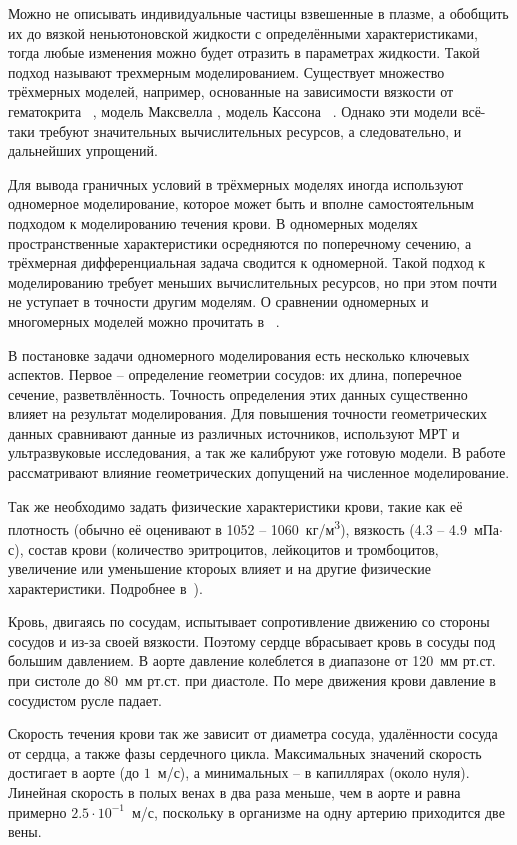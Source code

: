 Можно не описывать индивидуальные частицы взвешенные в плазме, а обобщить их до вязкой неньютоновской жидкости с определёнными 
характеристиками, тогда любые изменения можно будет отразить в параметрах жидкости. Такой подход называют трехмерным моделированием.
Существует множество трёхмерных моделей, например, основанные на зависимости вязкости от гематокрита ~\cite{walburn:1976},
модель Максвелла \cite{thurston:1972},  модель Кассона ~\cite{moller:2006}.
Однако эти модели всё-таки требуют значительных вычислительных ресурсов, а следовательно, и дальнейших упрощений. 

Для вывода граничных условий в трёхмерных моделях иногда используют одномерное моделирование, которое может быть 
и вполне самостоятельным подходом к моделированию течения крови.
В одномерных моделях пространственные характеристики осредняются по поперечному сечению, а трёхмерная дифференциальная
задача сводится к одномерной. Такой подход к моделированию требует меньших вычислительных ресурсов, но при этом почти не уступает в 
точности другим моделям. О сравнении одномерных и многомерных моделей можно прочитать в ~\cite{FORMAGGIA:2001}.

В постановке задачи одномерного моделирования есть несколько ключевых аспектов. Первое -- 
определение геометрии сосудов: их длина, поперечное сечение, разветвлённость. Точность определения этих данных существенно влияет 
на результат моделирования. Для повышения точности геометрических данных сравнивают данные из различных
источников, используют МРТ и ультразвуковые исследования, а так же калибруют уже готовую модели. В работе 
\cite{Shanmugavelayudam:2010} рассматривают влияние геометрических допущений на численное моделирование.

Так же необходимо задать физические характеристики крови, такие как её плотность (обычно её оценивают в 1052 -- 1060~кг/м\textsuperscript{3}),
вязкость (4.3 -- 4.9~мПа$\cdot$с), состав крови (количество эритроцитов, лейкоцитов и тромбоцитов, увеличение или уменьшение ктороых
влияет и на другие физические характеристики. Подробнее в~\cite{Bouchnita2020}).

Кровь, двигаясь по сосудам, испытывает сопротивление движению со стороны сосудов и из-за своей вязкости. Поэтому сердце вбрасывает 
кровь в сосуды под большим давлением. В аорте давление колеблется в диапазоне от 120~мм рт.ст. при систоле до 80~мм рт.ст. при диастоле. 
По мере движения крови давление в сосудистом русле падает. 

Скорость течения крови так же зависит от диаметра сосуда, удалённости сосуда от сердца, а также фазы сердечного цикла. 
Максимальных значений скорость достигает в аорте (до \texttilde$1$~м/с), а минимальных -- в капиллярах (около нуля).
Линейная скорость в полых венах в два раза меньше, чем в аорте и равна примерно $2.5\cdot10^{-1}$~м/с, 
поскольку в организме на одну артерию приходится две вены.

